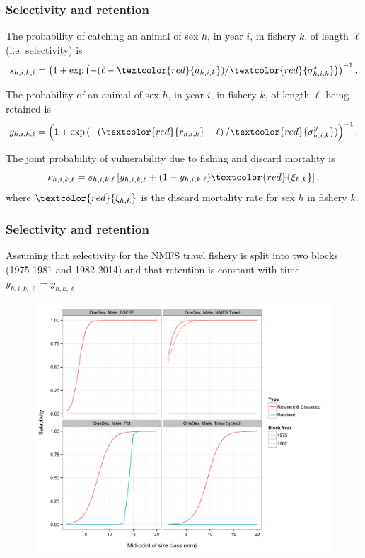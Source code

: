 \documentclass{beamer}
\begin{document}
\begin{frame}
\frametitle{Selectivity and retention}
The probability of catching an animal of sex $h$, in year $i$, in fishery $k$,
of length $\ell$ (i.e. selectivity) is
\begin{equation*}
  s_{h,i,k,\ell} = \left(1 + \exp \left(-(\ell - \textcolor{red}{a_{h,i,k}}) /
  \textcolor{red}{\sigma_{h,i,k}^s} \right) \right)^{-1}.
\end{equation*}

The probability of an animal of sex $h$, in year $i$, in fishery $k$, of length
$\ell$ being retained is
\begin{equation*}
  y_{h,i,k,\ell} = \left(1 + \exp \left(-(\textcolor{red}{r_{h,i,k}} - \ell \right) /
  \textcolor{red}{\sigma_{h,i,k}^y}) \right)^{-1}.
\end{equation*}

The joint probability of vulnerability due to fishing and discard mortality is
\begin{equation*}
  \nu_{h,i,k,\ell} = s_{h,i,k,\ell} \left[ y_{h,i,k,\ell} + (1 - y_{h,i,k,\ell})
    \textcolor{red}{\xi_{h,k}} \right],
\end{equation*}
where $\textcolor{red}{\xi_{h,k}}$ is the discard mortality rate for sex $h$ in
fishery $k$.
\end{frame}


\begin{frame}
\frametitle{Selectivity and retention}
Assuming that selectivity for the NMFS trawl fishery is split into two blocks
(1975-1981 and 1982-2014) and that retention is constant with time
$y_{h,i,k,\ell} = y_{h,k,\ell}$
\begin{figure}[!htbp]
  \centering
  \includegraphics[width=0.6\linewidth]{../../examples/bbrkc/OneSex/figure/selectivity.png}
\end{figure}
\end{frame}
\end{document}
